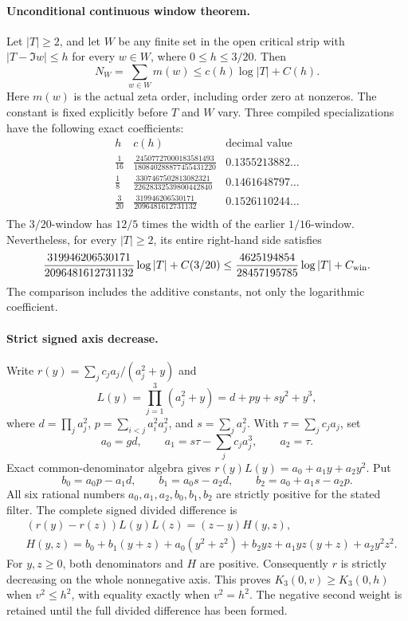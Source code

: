 \paragraph{Unconditional continuous window theorem.}
Let \(|T|\ge2\), and let \(W\) be any finite set in the open critical
strip with \(|T-\Im w|\le h\) for every \(w\in W\), where
\(0\le h\le3/20\).  Then
\begin{equation}
 N_W=\sum_{w\in W}m(w)\le c(h)\log|T|+C(h).
 \label{eq:exact-window-count}
\end{equation}
Here \(m(w)\) is the actual zeta order, including order zero at nonzeros.
The constant is fixed explicitly before \(T\) and \(W\) vary.
Three compiled specializations have the following exact coefficients:
\[
 \begin{array}{c|c|c}
 h & c(h) & \text{decimal value}\\\hline
\frac{1}{16} & \frac{24507727000183581493}{180840288877455431220} & 0.1355213882\ldots \\
\frac{1}{8} & \frac{3307467502813082321}{22628332539800442840} & 0.1461648797\ldots \\
\frac{3}{20} & \frac{319946206530171}{2096481612731132} & 0.1526110244\ldots \\
 \end{array}
\]
The \(3/20\)-window has \(12/5\) times the width of the earlier
\(1/16\)-window.  Nevertheless, for every \(|T|\ge2\), its entire
right-hand side satisfies
\begin{equation}
 \frac{319946206530171}{2096481612731132}\log|T|+C(3/20)
 \le\frac{4625194854}{28457195785}\log|T|+C_{\rm win}.
 \label{eq:exact-window-domination}
\end{equation}
The comparison includes the additive constants, not only the logarithmic
coefficient.

\paragraph{Strict signed axis decrease.}
Write \(r(y)=\sum_jc_ja_j/(a_j^2+y)\) and
\[
 L(y)=\prod_{j=1}^3(a_j^2+y)=d+py+sy^2+y^3,
\]
where \(d=\prod_ja_j^2\), \(p=\sum_{i<j}a_i^2a_j^2\), and
\(s=\sum_ja_j^2\).  With \(\tau=\sum_jc_ja_j\), set
\[
 a_0=gd,\qquad a_1=s\tau-\sum_jc_ja_j^3,\qquad a_2=\tau.
\]
Exact common-denominator algebra gives
\(r(y)L(y)=a_0+a_1y+a_2y^2\).  Put
\[
 b_0=a_0p-a_1d,\qquad b_1=a_0s-a_2d,\qquad
 b_2=a_0+a_1s-a_2p.
\]
All six rational numbers \(a_0,a_1,a_2,b_0,b_1,b_2\) are strictly
positive for the stated filter.  The complete signed divided difference is
\begin{align*}
 &(r(y)-r(z))L(y)L(z)=(z-y)H(y,z),\\
 &H(y,z)=b_0+b_1(y+z)+a_0(y^2+z^2)+b_2yz
       +a_1yz(y+z)+a_2y^2z^2.
\end{align*}
For \(y,z\ge0\), both denominators and \(H\) are positive.
Consequently \(r\) is strictly decreasing on the whole nonnegative
axis.  This proves \(K_3(0,v)\ge K_3(0,h)\) when \(v^2\le h^2\),
with equality exactly when \(v^2=h^2\).  The negative second weight
is retained until the full divided difference has been formed.

